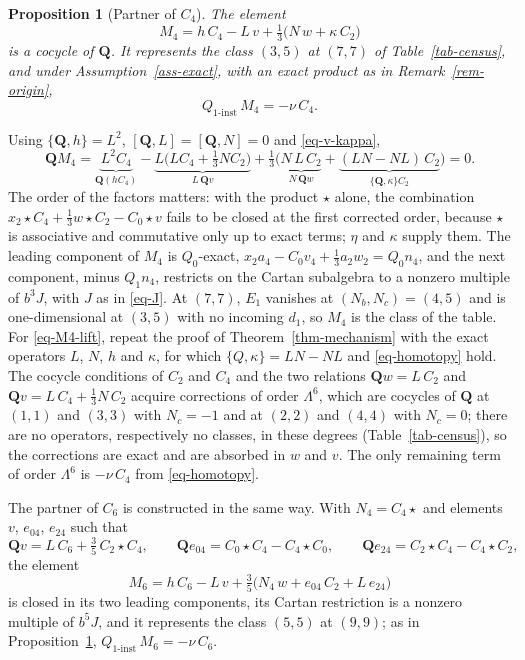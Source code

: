 \documentclass[11pt]{article}
\numberwithin{equation}{section}
\numberwithin{figure}{section}
\numberwithin{table}{section}
\newtheorem{proposition}[theorem]{Proposition}
\theoremstyle{definition}
\newcommand{\Qp}{\mathbf Q}
\newcommand{\Qi}{Q_{1\text{-}\mathrm{inst}}}
\begin{document}
\begin{proposition}[Partner of $C_4$]\label{prop-M4}
The element
\begin{equation}\label{eq-M4}
M_4=h\,C_4-L\,v+\tfrac13\big(N\,w+\kappa\,C_2\big)
\end{equation}
is a cocycle of $\Qp$. It represents the class $(3,5)$ at $(7,7)$ of Table~\ref{tab-census}, and under Assumption~\ref{ass-exact}, with an exact product as in Remark~\ref{rem-origin},
\begin{equation}\label{eq-M4-lift}
\Qi\,M_4=-\nu\,C_4 .
\end{equation}
\end{proposition}

\begin{proofbox}
Using $\{\Qp,h\}=L^2$, $[\Qp,L]=[\Qp,N]=0$ and \eqref{eq-v-kappa},
\[
\Qp M_4=\underbrace{L^2C_4}_{\Qp(hC_4)}-\underbrace{L\big(LC_4+\tfrac13NC_2\big)}_{L\,\Qp v}+\tfrac13\Big(\underbrace{N\,L\,C_2}_{N\,\Qp w}+\underbrace{(LN-NL)\,C_2}_{\{\Qp,\kappa\}C_2}\Big)=0 .
\]
The order of the factors matters: with the product $\star$ alone, the combination $x_2\star C_4+\tfrac13w\star C_2-C_0\star v$ fails to be closed at the first corrected order, because $\star$ is associative and commutative only up to exact terms; $\eta$ and $\kappa$ supply them. The leading component of $M_4$ is $Q_0$-exact, $x_2a_4-C_0v_4+\tfrac13a_2w_2=Q_0n_4$, and the next component, minus $Q_1n_4$, restricts on the Cartan subalgebra to a nonzero multiple of $b^3J$, with $J$ as in \eqref{eq-J}. At $(7,7)$, $E_1$ vanishes at $(N_b,N_c)=(4,5)$ and is one-dimensional at $(3,5)$ with no incoming $d_1$, so $M_4$ is the class of the table. For \eqref{eq-M4-lift}, repeat the proof of Theorem~\ref{thm-mechanism} with the exact operators $L$, $N$, $h$ and $\kappa$, for which $\{Q,\kappa\}=LN-NL$ and \eqref{eq-homotopy} hold. The cocycle conditions of $C_2$ and $C_4$ and the two relations $\Qp w=L\,C_2$ and $\Qp v=L\,C_4+\tfrac13N\,C_2$ acquire corrections of order $\Lambda^6$, which are cocycles of $\Qp$ at $(1,1)$ and $(3,3)$ with $N_c=-1$ and at $(2,2)$ and $(4,4)$ with $N_c=0$; there are no operators, respectively no classes, in these degrees (Table~\ref{tab-census}), so the corrections are exact and are absorbed in $w$ and $v$. The only remaining term of order $\Lambda^6$ is $-\nu\,C_4$ from \eqref{eq-homotopy}.
\end{proofbox}

The partner of $C_6$ is constructed in the same way. With $N_4=C_4\star{}$ and elements $v$, $e_{04}$, $e_{24}$ such that
\begin{equation}\label{eq-M6-inputs}
\Qp v=L\,C_6+\tfrac35\,C_2\star C_4,\qquad \Qp e_{04}=C_0\star C_4-C_4\star C_0,\qquad \Qp e_{24}=C_2\star C_4-C_4\star C_2,
\end{equation}
the element
\begin{equation}\label{eq-M6}
M_6=h\,C_6-L\,v+\tfrac35\big(N_4\,w+e_{04}\,C_2+L\,e_{24}\big)
\end{equation}
is closed in its two leading components, its Cartan restriction is a nonzero multiple of $b^5J$, and it represents the class $(5,5)$ at $(9,9)$; as in Proposition~\ref{prop-M4}, $\Qi\,M_6=-\nu\,C_6$.
\end{document}
